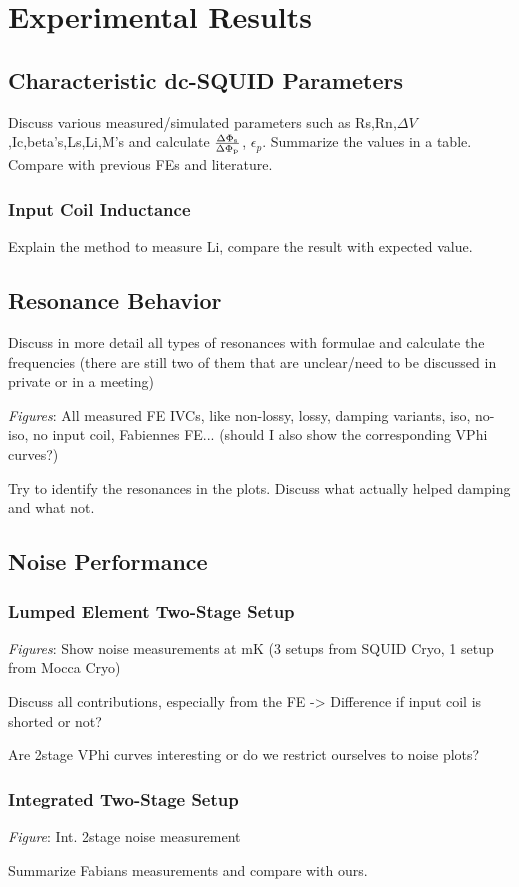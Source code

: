 \chapter{Experimental Results}

\section{Characteristic dc-SQUID Parameters}

Discuss various measured/simulated parameters such as Rs,Rn,$\Delta V$,Ic,beta's,Ls,Li,M's and calculate $\frac{\Delta\Phi_{\rm s}}{\Delta\Phi_{\rm p}}$, $\epsilon_p$. Summarize the values in a table. Compare with previous FEs and literature. 

\subsection{Input Coil Inductance}

Explain the method to measure Li, compare the result with expected value.

\section{Resonance Behavior}\label{sec_resonance_results}

Discuss in more detail all types of resonances with formulae and calculate the frequencies (there are still two of them that are unclear/need to be discussed in private or in a meeting)

\textit{Figures}: All measured FE IVCs, like non-lossy, lossy, damping variants, iso, no-iso, no input coil, Fabiennes FE... (should I also show the corresponding VPhi curves?)

Try to identify the resonances in the plots. Discuss what actually helped damping and what not. 

\section{Noise Performance}

\subsection{Lumped Element Two-Stage Setup}

\textit{Figures}: Show noise measurements at mK (3 setups from SQUID Cryo, 1 setup from Mocca Cryo) 

Discuss all contributions, especially from the FE -> Difference if input coil is shorted or not?

Are 2stage VPhi curves interesting or do we restrict ourselves to noise plots?

\subsection{Integrated Two-Stage Setup}

\textit{Figure}: Int. 2stage noise measurement

Summarize Fabians measurements and compare with ours. 